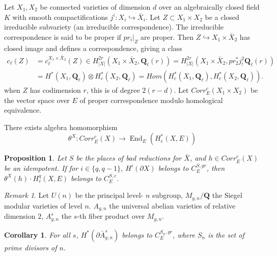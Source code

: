 \documentclass[leqno]{amsart}
\newcommand{\Q}{{\mathbf{Q}}}
\newcommand{\Ql}{\mathbf{Q}_\ell}
\newcommand{\1}{\mathbf{1}}
\DeclareMathOperator{\End}{End}
\newtheorem{prop}[thm]{Proposition}
\newtheorem{cor}[thm]{Corollary}
\theoremstyle{definition}
\theoremstyle{remark}
\newtheorem{rem}[thm]{Remark}
\begin{document}
Let $X_1,X_2$ be connected varieties of dimension  $d$
over an algebraically closed field  $K$
with smooth compactifications  
$j^i\colon X_i\hookrightarrow \bar{X}_i$.
Let $Z\subset X_1\times X_2$
be a closed irreducible subvariety
(an irreducible correspondence).
The irreducible correspondence
is said to be proper if 
$pr_i\vert_Z$ are proper.
Then  $Z\hookrightarrow X_1\times \bar{X}_2$
has closed image and defines a correspondence, 
giving a class
\begin{align*}
	c_\ell(Z)&=c^{X_1\times \bar{X}_2}_\ell(Z)
	\in H^{2r}_{|X|}(X_1\times \bar{X}_2, \Ql(r))
	= H^{2r}_{|X|}(X_1\times \bar{X}_2, pr_2^*j^2_!\Ql(r))\\
	 &=H^*(X_1,\Ql)\otimes H^*_c(X_2,\Ql)
	=Hom(H^*_c(X_1,\Ql), H^*_c(X_2,\Ql)).
\end{align*}
when $Z$ has codimension  $r$,
this is of degree $2(r-d)$. 
Let  $Corr^c_E(X_1\times X_2)$
be the vector space over  $E$ 
of proper correspondence modulo 
homological equivalence.

There exists algebra homomorphism
\[
	\theta^X\colon 
	Corr_E^c(X)\to \End_E(H^*_c(X,E))
\]

\begin{prop}
	Let $S$ be the places of bad reductions for  $ \bar{X}$,
	and $h\in Corr_E^c(X)$ be an idempotent. 
	If for  $i\in \{q,q-1\}$,
	$H^i(\partial X)$ belongs to  $C_E^{S,gr}$,
	then $\theta^X(h)\cdot H^q_c(X,E)$
	belongs to  $C_E^{S,c}$.
\end{prop}

\begin{rem}
	Let $U(n)$ be the principal level- $n$ subgroup,
	 $M_{g,n}/\Q$ the Siegel modular varieties of level $n$.
	  $A_{g,n}$ the universal abelian varieties
	  of relative dimension $2$,
	   $A_{g,n}^s$ the $s$-th fiber product over $M_{g,n}$.
\end{rem}

\begin{cor}
	For all $s$,  $H^*(\partial \bar{A}_{g,n}^s)$
	belongs to $C_E^{S_n,gr}$,
	where $S_n$ is the set of prime divisors of  $n$.
\end{cor}
\end{document}
